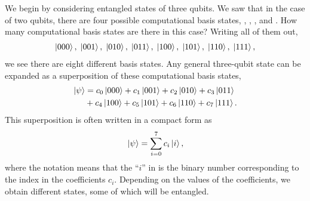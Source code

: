 We begin by considering entangled states of three qubits.
We saw that in the case of two qubits, there are four possible computational basis states, , , , and .
How many computational basis states are there in this case?
Writing all of them out,
\begin{align}
    \left| 000 \right\rangle, \; \left| 001 \right\rangle, \; \left| 010 \right\rangle, \; \left| 011 \right\rangle, \; \left| 100 \right\rangle, \; \left| 101 \right\rangle, \; \left| 110 \right\rangle, \; \left| 111 \right\rangle,
\end{align}
we see there are eight different basis states.
Any general three-qubit state can be expanded as a superposition of these computational basis states,
\begin{align}
    \left| \psi \right\rangle & = c_0\left| 000 \right\rangle + c_1\left| 001 \right\rangle + c_2\left| 010 \right\rangle + c_3\left| 011 \right\rangle \nonumber\\
    & + c_4\left| 100 \right\rangle + c_5\left| 101 \right\rangle + c_6\left| 110 \right\rangle + c_7\left| 111 \right\rangle.
\end{align}
This superposition is often written in a compact form as
\begin{equation}
    \left| \psi \right\rangle = \sum_{i=0}^7 c_i \left| i \right\rangle,
\end{equation}
where the notation means that the ``$i$'' in  is the binary number corresponding to the index in the coefficients $c_i$.
Depending on the values of the coefficients, we obtain different states, some of which will be entangled.

